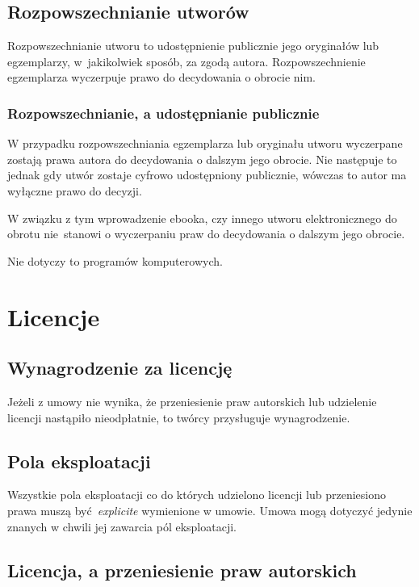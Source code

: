 \documentclass{article}
\begin{document}
\subsection{Rozpowszechnianie utworów}

Rozpowszechnianie utworu to udostępnienie publicznie jego oryginałów lub egzemplarzy, w~jakikolwiek sposób, za zgodą autora. Rozpowszechnienie egzemplarza wyczerpuje prawo do decydowania o obrocie nim.

\subsubsection{Rozpowszechnianie, a udostępnianie publicznie}

W przypadku rozpowszechniania egzemplarza lub oryginału utworu wyczerpane zostają prawa autora do decydowania o dalszym jego obrocie.
Nie następuje to jednak gdy utwór zostaje cyfrowo udostępniony publicznie, wówczas to autor ma wyłączne prawo do decyzji.

W związku z tym wprowadzenie ebooka, czy innego utworu elektronicznego do obrotu nie~stanowi o wyczerpaniu praw do decydowania o dalszym jego obrocie.

Nie dotyczy to programów komputerowych.

\newpage

\section{Licencje}

\subsection{Wynagrodzenie za licencję}

Jeżeli z umowy nie wynika, że przeniesienie praw autorskich lub udzielenie licencji nastąpiło nieodpłatnie, to twórcy przysługuje wynagrodzenie.

\subsection{Pola eksploatacji}

Wszystkie pola eksploatacji co do których udzielono licencji lub przeniesiono prawa muszą być~\textit{explicite} wymienione w umowie. Umowa mogą dotyczyć jedynie znanych w chwili jej zawarcia pól eksploatacji.

\subsection{Licencja, a przeniesienie praw autorskich}
\end{document}
